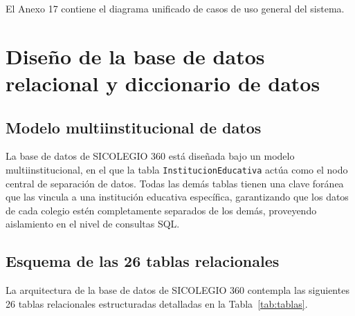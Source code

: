 \documentclass[12pt,a4paper,oneside]{report}
\begin{document}
El Anexo 17 contiene el diagrama unificado de casos de uso general del sistema.

\section{Diseño de la base de datos relacional y diccionario de datos}

\subsection{Modelo multiinstitucional de datos}
La base de datos de SICOLEGIO 360 está diseñada bajo un modelo multiinstitucional, en el que la tabla \texttt{InstitucionEducativa} actúa como el nodo central de separación de datos. Todas las demás tablas tienen una clave foránea que las vincula a una institución educativa específica, garantizando que los datos de cada colegio estén completamente separados de los demás, proveyendo aislamiento en el nivel de consultas SQL.

\subsection{Esquema de las 26 tablas relacionales}
La arquitectura de la base de datos de SICOLEGIO 360 contempla las siguientes 26 tablas relacionales estructuradas detalladas en la Tabla~\ref{tab:tablas}.
\end{document}
